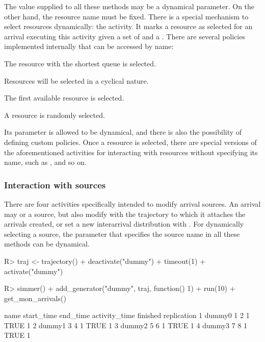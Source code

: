 \documentclass[
  nojss]{jss}
\providecommand{\tightlist}{%
  \setlength{\itemsep}{0pt}\setlength{\parskip}{0pt}}
\begin{document}
The value supplied to all these methods may be a dynamical parameter. On
the other hand, the resource name must be fixed. There is a special
mechanism to select resources dynamically: the  activity.
It marks a resource as selected for an arrival executing this activity
given a set of  and a . There are several
policies implemented internally that can be accessed by name:

\begin{description}
\tightlist
\item[shortest-queue]
The resource with the shortest queue is selected.
\item[round-robin]
Resources will be selected in a cyclical nature.
\item[first-available]
The first available resource is selected.
\item[random]
A resource is randomly selected.
\end{description}

Its  parameter is allowed to be dynamical, and there is
also the possibility of defining custom policies. Once a resource is
selected, there are special versions of the aforementioned activities
for interacting with resources without specifying its name, such as
,  and so on.

\hypertarget{interaction-with-sources}{%
\subsubsection{Interaction with
sources}\label{interaction-with-sources}}

There are four activities specifically intended to modify arrival
sources. An arrival may  or  a
source, but also modify with  the trajectory to
which it attaches the arrivals created, or set a new interarrival
distribution with . For dynamically selecting a
source, the parameter that specifies the source name in all these
methods can be dynamical.

\begin{CodeChunk}
\begin{CodeInput}
R> traj <- trajectory() %
+   deactivate("dummy") %
+   timeout(1) %
+   activate("dummy")
\end{CodeInput}
\end{CodeChunk}

\begin{CodeChunk}
\begin{CodeInput}
R> simmer() %
+   add_generator("dummy", traj, function() 1) %
+   run(10) %
+   get_mon_arrivals()
\end{CodeInput}
\begin{CodeOutput}
    name start_time end_time activity_time finished replication
1 dummy0          1        2             1     TRUE           1
2 dummy1          3        4             1     TRUE           1
3 dummy2          5        6             1     TRUE           1
4 dummy3          7        8             1     TRUE           1
\end{CodeOutput}
\end{CodeChunk}
\end{document}
